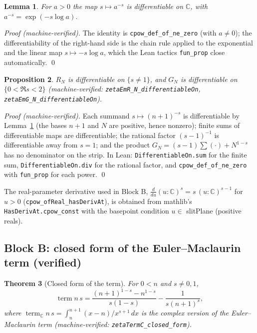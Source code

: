 \documentclass{article}
\newtheorem{theorem}{Theorem}[section]
\newtheorem{lemma}[theorem]{Lemma}
\newtheorem{proposition}[theorem]{Proposition}
\newcommand{\C}{\mathbb{C}}
\begin{document}
\begin{lemma}
\label{lem:cpowderiv}
For $a>0$ the map $s\mapsto a^{-s}$ is differentiable on $\C$, with
$a^{-s}=\exp(-s\log a)$.
\end{lemma}

\emph{Proof (machine-verified).} The identity is
\texttt{cpow\_def\_of\_ne\_zero} (with $a\neq 0$); the differentiability of
the right-hand side is the chain rule applied to the exponential and the
linear map $s\mapsto -s\log a$, which the Lean tactics \texttt{fun\_prop}
close automatically. \qed

\begin{proposition}
\label{prop:blockA}
$R_N$ is differentiable on $\{s\neq 1\}$, and $G_N$ is differentiable on
$\{0<\Re s<2\}$ (machine-verified:
\texttt{zetaEmR\_N\_differentiableOn}, \texttt{zetaEmG\_N\_differentiableOn}).
\end{proposition}

\emph{Proof (machine-verified).} Each summand $s\mapsto(n+1)^{-s}$ is
differentiable by Lemma~\ref{lem:cpowderiv} (the bases $n+1$ and $N$ are
positive, hence nonzero); finite sums of differentiable maps are
differentiable; the rational factor $(s-1)^{-1}$ is differentiable away
from $s=1$; and the product $G_N=(s-1)\sum(\cdot)+N^{1-s}$ has no
denominator on the strip. In Lean: \texttt{DifferentiableOn.sum} for the
finite sum, \texttt{DifferentiableOn.div} for the rational factor, and
\texttt{cpow\_def\_of\_ne\_zero} with \texttt{fun\_prop} for each power.
\qed

The real-parameter derivative used in Block B,
$\frac{d}{du}(u:\C)^s=s\,(u:\C)^{s-1}$ for $u>0$
(\texttt{cpow\_ofReal\_hasDerivAt}), is obtained from mathlib's
\texttt{HasDerivAt.cpow\_const} with the basepoint condition
$u\in$ slitPlane (positive reals).

\subsection{Block B: closed form of the Euler--Maclaurin term (verified)}
\label{sec:blockB}

\begin{theorem}[Closed form of the term]
\label{thm:closed}
For $0<n$ and $s\neq 0,1$,
\begin{equation}
\label{eq:closed}
\operatorname{term} n\,s
=\frac{(n+1)^{1-s}-n^{1-s}}{s(1-s)}-\frac{1}{s(n+1)^s},
\end{equation}
where $\operatorname{term}_{\C} n\,s=\int_n^{n+1}(x-n)/x^{s+1}\,dx$ is the
complex version of the Euler--Maclaurin term
(machine-verified: \texttt{zetaTermC\_closed\_form}).
\end{theorem}
\end{document}

